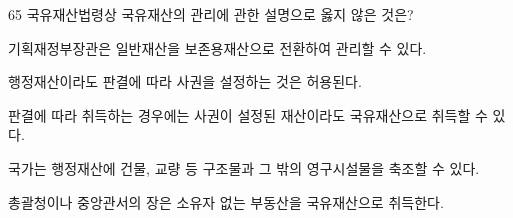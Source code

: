 \begin{question}{65}
국유재산법령상 국유재산의 관리에 관한 설명으로 옳지 않은 것은?
\begin{choices}
  \item 기획재정부장관은 일반재산을 보존용재산으로 전환하여 관리할 수 있다.
  \item 행정재산이라도 판결에 따라 사권을 설정하는 것은 허용된다.
  \item 판결에 따라 취득하는 경우에는 사권이 설정된 재산이라도 국유재산으로 취득할 수 있다.
  \item 국가는 행정재산에 건물, 교량 등 구조물과 그 밖의 영구시설물을 축조할 수 있다.
  \item 총괄청이나 중앙관서의 장은 소유자 없는 부동산을 국유재산으로 취득한다.
\end{choices}
\end{question}
